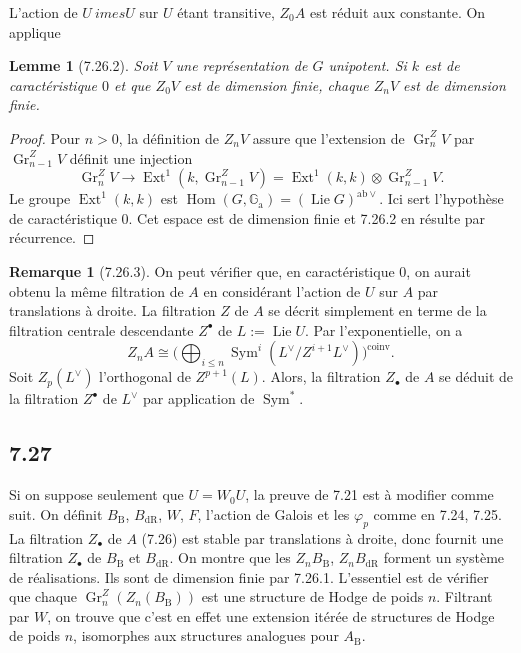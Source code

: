 \documentclass[12pt,a4paper]{article}
\theoremstyle{plain}
\newtheorem{lemma}[theorem]{Lemme}
\theoremstyle{definition}
\newtheorem{remark}[theorem]{Remarque}
\theoremstyle{remark}
\DeclareMathOperator{\Hom}{Hom}
\DeclareMathOperator{\Ext}{Ext}
\DeclareMathOperator{\Lie}{Lie}
\DeclareMathOperator{\Gr}{Gr}
\DeclareMathOperator{\Sym}{Sym}
\newcommand{\Ga}{\mathbb{G}_\mathrm{a}}
\newcommand{\DR}{\mathrm{dR}}
\newcommand{\B}{\mathrm{B}}
\begin{document}
L'action de $U \	imes U$ sur $U$ \'etant transitive, $Z_0A$ est r\'eduit aux constante. On applique

\begin{lemma}[7.26.2]\label{lem:7.26.2}
Soit $V$ une repr\'esentation de $G$ unipotent. Si $k$ est de caract\'eristique $0$ et que $Z_0V$ est de dimension finie, chaque $Z_nV$ est de dimension finie.
\end{lemma}

\begin{proof}
Pour $n > 0$, la d\'efinition de $Z_nV$ assure que l'extension de $\Gr_n^ZV$ par $\Gr_{n-1}^ZV$ d\'efinit une injection
\[
\Gr_n^ZV \longrightarrow \Ext^1(k, \Gr_{n-1}^ZV) = \Ext^1(k,k) \otimes \Gr_{n-1}^ZV.
\]
Le groupe $\Ext^1(k,k)$ est $\Hom(G, \Ga) = (\Lie G)^{\mathrm{ab} \vee}$. Ici sert l'hypoth\`ese de caract\'eristique $0$. Cet espace est de dimension finie et 7.26.2 en r\'esulte par r\'ecurrence.
\end{proof}

\begin{remark}[7.26.3]\label{rem:7.26.3}
On peut v\'erifier que, en caract\'eristique $0$, on aurait obtenu la m\^eme filtration de $A$ en consid\'erant l'action de $U$ sur $A$ par translations \`a droite. La filtration $Z$ de $A$ se d\'ecrit simplement en terme de la filtration centrale descendante $Z^\bullet$ de $L := 
\Lie U$. Par l'exponentielle, on a
\[
Z_nA \cong \bigl(\bigoplus_{i \leq n} 
\Sym^i(L^\vee/Z^{i+1}L^\vee)\bigr)^{\mathrm{coinv}}.
\]
Soit $Z_p(L^\vee)$ l'orthogonal de $Z^{p+1}(L)$. Alors, la filtration $Z_\bullet$ de $A$ se d\'eduit de la filtration $Z^\bullet$ de $L^\vee$ par application de $\Sym^*$.
\end{remark}

\subsection*{7.27}
Si on suppose seulement que $U = W_0U$, la preuve de 7.21 est \`a modifier comme suit. On d\'efinit $B_\B$, $B_\DR$, $W$, $F$, l'action de Galois et les $\varphi_p$ comme en 7.24, 7.25. La filtration $Z_\bullet$ de $A$ (7.26) est stable par translations \`a droite, donc fournit une filtration $Z_\bullet$ de $B_\B$ et $B_\DR$. On montre que les $Z_nB_\B$, $Z_nB_\DR$ forment un syst\`eme de r\'ealisations. Ils sont de dimension finie par 7.26.1. L'essentiel est de v\'erifier que chaque $\Gr_n^Z(Z_n(B_\B))$ est une structure de Hodge de poids $n$. Filtrant par $W$, on trouve que c'est en effet une extension it\'er\'ee de structures de Hodge de poids $n$, isomorphes aux structures analogues pour $A_\B$.
\end{document}
